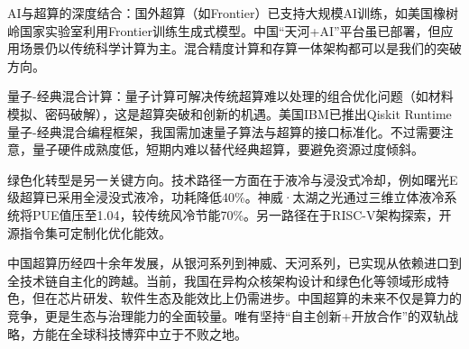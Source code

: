 \documentclass[a4paper]{article}
\begin{document}
AI与超算的深度结合：国外超算（如Frontier）已支持大规模AI训练，如美国橡树岭国家实验室利用Frontier训练生成式模型。中国“天河+AI”平台虽已部署，但应用场景仍以传统科学计算为主。混合精度计算和存算一体架构都可以是我们的突破方向。

量子-经典混合计算：量子计算可解决传统超算难以处理的组合优化问题（如材料模拟、密码破解），这是超算突破和创新的机遇。美国IBM已推出Qiskit Runtime量子-经典混合编程框架，我国需加速量子算法与超算的接口标准化。不过需要注意，量子硬件成熟度低，短期内难以替代经典超算，要避免资源过度倾斜。

绿色化转型是另一关键方向。技术路径一方面在于液冷与浸没式冷却，例如曙光E级超算已采用全浸没式液冷，功耗降低40\%。神威·太湖之光通过三维立体液冷系统将PUE值压至1.04，较传统风冷节能70\%。另一路径在于RISC-V架构探索，开源指令集可定制化优化能效。

中国超算历经四十余年发展，从银河系列到神威、天河系列，已实现从依赖进口到全技术链自主化的跨越。当前，我国在异构众核架构设计和绿色化等领域形成特色，但在芯片研发、软件生态及能效比上仍需进步。中国超算的未来不仅是算力的竞争，更是生态与治理能力的全面较量。唯有坚持“自主创新+开放合作”的双轨战略，方能在全球科技博弈中立于不败之地。


\newpage

 
\end{document}
